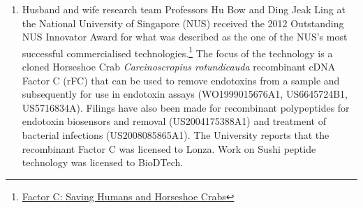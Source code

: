 \documentclass[]{book}
\theoremstyle{definition}
\theoremstyle{definition}
\theoremstyle{definition}
\theoremstyle{remark}
\begin{document}
\begin{enumerate}
{  M Vlak (known as Just Vlak)} is at the University of Wageningen and
  has collaborated with NX Tuyen, who is affiliated with the University
  of Wageningen and the Institute for Aquaculture Research in Ho Chi
  Minh City, Vietnam \citep[see][]{Tuyen_2014}. Justinus Vlak had
  previously filed for patents in 1999 and 2000 including for Proteins
  derived from White Spot Syndrome Virus (WO2001009340A1), antigenic
  proteins of shrimp white spot virus (WO2002022664A2), and a White Spot
  Syndrome Virus Vaccine (WO2003000900A1) with Akzo Nobel NV and
  Intervet Iinternational BV.
\item
  Husband and wife research team Professors Hu Bow and Ding Jeak Ling at
  the National University of Singapore (NUS) received the 2012
  Outstanding NUS Innovator Award for what was described as the one of
  the NUS's most successful commercialised technologies.\footnote{\href{http://enterprise.nus.edu.sg/success-stories/detail/12}{Factor
    C: Saving Humans and Horseshoe Crabs}} The focus of the technology
  is a cloned Horseshoe Crab \emph{Carcinoscropius rotundicauda}
  recombinant cDNA Factor C (rFC) that can be used to remove endotoxins
  from a sample and subsequently for use in endotoxin assays
  (WO1999015676A1, US6645724B1, US5716834A). Filings have also been made
  for recombinant polypeptides for endotoxin biosensors and removal
  (US2004175388A1) and treatment of bacterial infections
  (US2008085865A1). The University reports that the recombinant Factor C
  was licensed to Lonza. Work on Sushi peptide technology was licensed
  to BioDTech.
\end{enumerate}
\end{document}
